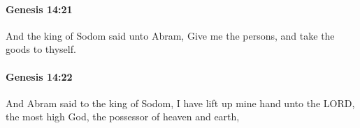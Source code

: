 		\paragraph{Genesis 14:21} %
			\label{GENESIS-14-21}

			And the king of Sodom said unto Abram, Give me the persons, and take the goods to thyself.


		\paragraph{Genesis 14:22} %
			\label{GENESIS-14-22}

			And Abram said to the king of Sodom, I have lift up mine hand unto the LORD, the most high God, the possessor of heaven and earth,


